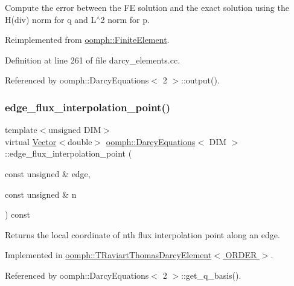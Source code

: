 Compute the error between the FE solution and the exact solution using the H(div) norm for q and L$^\wedge$2 norm for p. 



Reimplemented from \hyperlink{classoomph_1_1FiniteElement_a745d818aa291fe61538117c5f6c2b294}{oomph\+::\+Finite\+Element}.



Definition at line 261 of file darcy\+\_\+elements.\+cc.



Referenced by oomph\+::\+Darcy\+Equations$<$ 2 $>$\+::output().

\mbox{\label{classoomph_1_1DarcyEquations_aebfe04cc9fedf1ba024b4db2b1d44de5}} 
\subsubsection{\texorpdfstring{edge\+\_\+flux\+\_\+interpolation\+\_\+point()}{edge\_flux\_interpolation\_point()}}
{\footnotesize\ttfamily template$<$unsigned D\+IM$>$ \\
virtual \hyperlink{classoomph_1_1Vector}{Vector}$<$double$>$ \hyperlink{classoomph_1_1DarcyEquations}{oomph\+::\+Darcy\+Equations}$<$ D\+IM $>$\+::edge\+\_\+flux\+\_\+interpolation\+\_\+point (\begin{DoxyParamCaption}\item[{const unsigned \&}]{edge,  }\item[{const unsigned \&}]{n }\end{DoxyParamCaption}) const\hspace{0.3cm}{\ttfamily [pure virtual]}}



Returns the local coordinate of nth flux interpolation point along an edge. 



Implemented in \hyperlink{classoomph_1_1TRaviartThomasDarcyElement_adde4a19355d0a4142c462d2271e5cbcf}{oomph\+::\+T\+Raviart\+Thomas\+Darcy\+Element$<$ O\+R\+D\+E\+R $>$}.



Referenced by oomph\+::\+Darcy\+Equations$<$ 2 $>$\+::get\+\_\+q\+\_\+basis().

